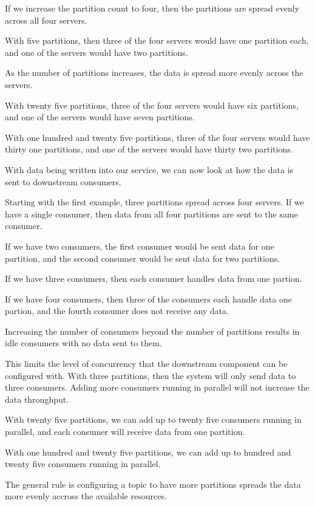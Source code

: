 \documentclass{article}
\begin{document}
If we increase the partition count to four, then the partitions are spread
evenly across all four servers.

With five partitions, then three of the four servers would have one partition each,
and one of the servers would have two partitions.

As the number of partitions increases, the data is spread more evenly across the servers.

With twenty five partitions, three of the four servers would have six
partitions, and one of the servers would have seven partitions.

With one hundred and twenty five partitions, three of the four servers would have thirty one
partitions, and one of the servers would have thirty two partitions.


With data being written into our service, we can now look at
how the data is sent to downstream consumers.

Starting with the first example, three partitions spread across four servers.
If we have a single consumer, then data from all four partitions are sent to the
same consumer.

If we have two consumers, the first consumer would be sent data for one partition,
and the second consumer would be sent data for two partitions.

If we have three consumers, then each consumer handles data from one partion.

If we have four consumers, then three of the consumers each handle data one partion,
and the fourth consumer does not receive any data.

Increasing the number of consumers beyond the number of partitions
results in idle consumers with no data sent to them.

This limits the level of concurrency that the downstream component can be configured with.
With three partitions, then the system will only send data to three consumers.
Adding more consumers running in parallel will not increase the data throughput.

With twenty five partitions, we can add up to twenty five consumers running in parallel,
and each consumer will receive data from one partition.

With one hundred and twenty five partitions, we can add up to hundred and twenty five
consumers running in parallel.

The general rule is configuring a topic to have more partitions spreads the data more
evenly accross the available resources.
\end{document}
